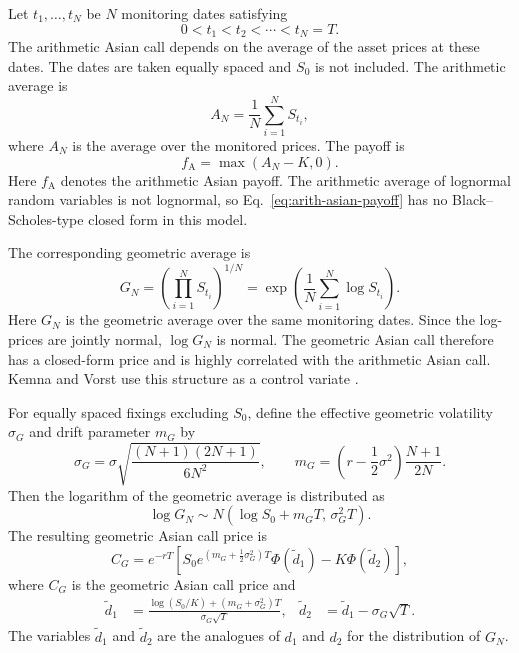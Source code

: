 \documentclass[12pt]{article}
\begin{document}
Let $t_1,\ldots,t_N$ be $N$ monitoring dates satisfying
\begin{equation}
    0<t_1<t_2<\cdots<t_N=T.
\end{equation}
The arithmetic Asian call depends on the average of the asset prices at these dates.  The dates are taken equally spaced and $S_0$ is not included.  The arithmetic average is
\begin{equation}
    A_N = \frac{1}{N}\sum_{i=1}^{N}S_{t_i},
\end{equation}
where $A_N$ is the average over the monitored prices.  The payoff is
\begin{equation}
    f_{\mathrm{A}} = \max(A_N-K,0).
    \label{eq:arith-asian-payoff}
\end{equation}
Here $f_{\mathrm{A}}$ denotes the arithmetic Asian payoff.  The arithmetic average of lognormal random variables is not lognormal, so Eq.~\eqref{eq:arith-asian-payoff} has no Black--Scholes-type closed form in this model.

The corresponding geometric average is
\begin{equation}
    G_N =
    \left(\prod_{i=1}^{N}S_{t_i}\right)^{1/N}
    =
    \exp\!\left(\frac{1}{N}\sum_{i=1}^{N}\log S_{t_i}\right).
\end{equation}
Here $G_N$ is the geometric average over the same monitoring dates.  Since the log-prices are jointly normal, $\log G_N$ is normal.  The geometric Asian call therefore has a closed-form price and is highly correlated with the arithmetic Asian call.  Kemna and Vorst use this structure as a control variate \cite{kemnaPricingMethodOptions1990}.

For equally spaced fixings excluding $S_0$, define the effective geometric volatility $\sigma_G$ and drift parameter $m_G$ by
\begin{equation}
    \sigma_G
    =
    \sigma
    \sqrt{
        \frac{(N+1)(2N+1)}{6N^2}
    },
    \qquad
    m_G =
    \left(r-\frac{1}{2}\sigma^2\right)\frac{N+1}{2N}.
    \label{eq:geo-params}
\end{equation}
Then the logarithm of the geometric average is distributed as
\begin{equation}
    \log G_N
    \sim
    N\!\left(
        \log S_0 + m_GT,\,
        \sigma_G^2T
    \right).
\end{equation}
The resulting geometric Asian call price is
\begin{equation}
    C_G
    =
    e^{-rT}
    \left[
        S_0e^{(m_G+\frac{1}{2}\sigma_G^2)T}\Phi(\widetilde d_1)
        -
        K\Phi(\widetilde d_2)
    \right],
    \label{eq:geo-asian-price}
\end{equation}
where $C_G$ is the geometric Asian call price and
\begin{align}
    \widetilde d_1
    &=
    \frac{\log(S_0/K)+(m_G+\sigma_G^2)T}
         {\sigma_G\sqrt{T}},
    &
    \widetilde d_2
    &=
    \widetilde d_1-\sigma_G\sqrt{T}.
\end{align}
The variables $\widetilde d_1$ and $\widetilde d_2$ are the analogues of $d_1$ and $d_2$ for the distribution of $G_N$.
\end{document}
